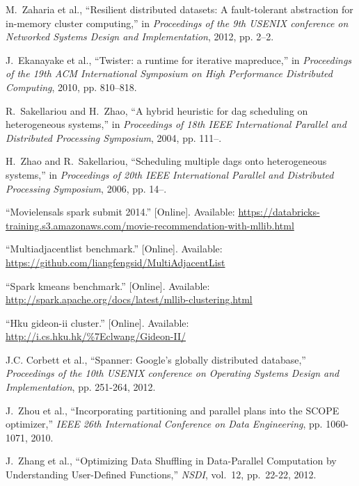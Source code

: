 \documentclass[10pt,journal,compsoc]{IEEEtran}
\begin{document}
\begin{thebibliography}{44}
M.~Zaharia et al., ``Resilient distributed datasets: A fault-tolerant
  abstraction for in-memory cluster computing,'' in \emph{Proceedings of the
  9th USENIX conference on Networked Systems Design and Implementation}, 2012,
  pp. 2--2.

J.~Ekanayake et al.,
  ``Twister: a runtime for iterative mapreduce,'' in \emph{Proceedings of the
  19th ACM International Symposium on High Performance Distributed Computing},
  2010, pp. 810--818.

R.~Sakellariou and H.~Zhao, ``A hybrid heuristic for dag scheduling on
  heterogeneous systems,'' in \emph{Proceedings of 18th IEEE International
  Parallel and Distributed Processing Symposium}, 2004, pp. 111--.

H.~Zhao and R.~Sakellariou, ``Scheduling multiple dags onto heterogeneous
  systems,'' in \emph{Proceedings of 20th IEEE International Parallel and
  Distributed Processing Symposium}, 2006, pp. 14--.

\BIBentryALTinterwordspacing
``Movielensals spark submit 2014.'' [Online]. Available:
  \url{https://databricks-training.s3.amazonaws.com/movie-recommendation-with-mllib.html}
\BIBentrySTDinterwordspacing

\BIBentryALTinterwordspacing
``Multiadjacentlist benchmark.'' [Online]. Available:
  \url{https://github.com/liangfengsid/MultiAdjacentList}
\BIBentrySTDinterwordspacing

\BIBentryALTinterwordspacing
``Spark kmeans benchmark.'' [Online]. Available:
  \url{http://spark.apache.org/docs/latest/mllib-clustering.html}
\BIBentrySTDinterwordspacing

\BIBentryALTinterwordspacing
``Hku gideon-ii cluster.'' [Online]. Available:
  \url{http://i.cs.hku.hk/\%7Eclwang/Gideon-II/}
\BIBentrySTDinterwordspacing

J.C. Corbett et al., ``Spanner: Google’s globally distributed database,'' 
\emph{Proceedings of the 10th USENIX conference on Operating Systems Design and Implementation}, pp. 251-264, 2012.

J.~Zhou et al., ``Incorporating partitioning and parallel plans into the SCOPE optimizer,'' \emph{IEEE 26th International Conference on Data Engineering}, pp. 1060-1071, 2010.

J.~Zhang et al., ``Optimizing Data Shuffling in Data-Parallel Computation by Understanding User-Defined Functions,'' \emph{NSDI}, vol.~12, pp.~22-22, 2012.


\end{thebibliography}
\end{document}

